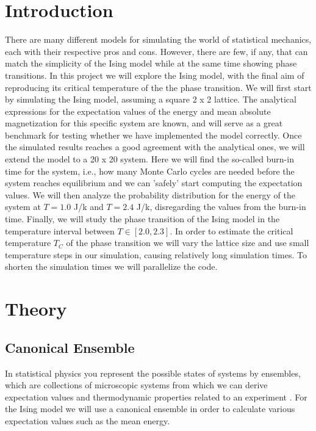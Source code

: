 \documentclass{article}
\begin{document}
\begin{multicols}{2}

\section{Introduction}
There are many different models for simulating the world of statistical mechanics, each with their respective pros and cons. However, there are few, if any, that can match the simplicity of the Ising model while at the same time showing phase transitions. In this project we will explore the Ising model, with the final aim of reproducing its critical temperature of the the phase transition. We will first start by simulating the Ising model, assuming a square 2 x 2 lattice. The analytical expressions for the expectation values of the energy and mean absolute magnetization for this specific system are known, and will serve as a great benchmark for testing whether we have implemented the model correctly. Once the simulated results reaches a good agreement with the analytical ones, we will extend the model to a 20 x 20 system. Here we will find the so-called burn-in time for the system, i.e., how many Monte Carlo cycles are needed before the system reaches equilibrium and we can 'safely' start computing the expectation values. We will then analyze the probability distribution for the energy of the system at $T=1.0$ J/k and $T=2.4$ J/k, disregarding the values from the burn-in time. Finally, we will study the phase transition of the Ising model in the temperature interval between $T\in[2.0, 2.3]$. In order to estimate the critical temperature $T_C$ of the phase transition we will vary the lattice size and use small temperature steps in our simulation, causing relatively long simulation times. To shorten the simulation times we will parallelize the code. 


\section{Theory}

\subsection{Canonical Ensemble}
In statistical physics you represent the possible states of systems by ensembles, which are collections of microscopic systems from which we can derive expectation values and thermodynamic properties related to an experiment \cite{95}. For the Ising model we will use a canonical ensemble in order to calculate various expectation values such as the mean energy. 


\end{multicols}
\end{document}
